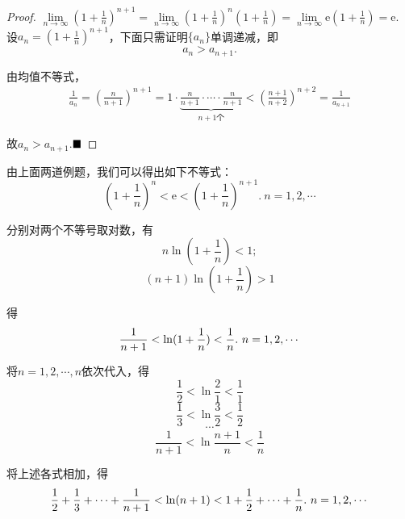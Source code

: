 \begin{proof}
	$\lim\limits_{n\to\infty}(1+\frac{1}{n})^{n+1}=\lim\limits_{n\to\infty}(1+\frac{1}{n})^n(1+\frac{1}{n})=\lim\limits_{n\to\infty}\text{e}(1+\frac{1}{n})=\text{e}.$
	设$a_n=(1+\frac{1}{n})^{n+1}$，下面只需证明$\{a_n\}$单调递减，即$$a_n>a_{n+1}.$$
	
	由均值不等式，
	\begin{align*}
		\frac{1}{a_n}=(\frac{n}{n+1})^{n+1}
		=1\cdot \underbrace{\frac{n}{n+1}\cdot\cdots\cdot\frac{n}{n+1}}_{n+1\text{个}}<(\frac{n+1}{n+2})^{n+2}=\frac{1}{a_{n+1}}
	\end{align*}
	
	故$a_n>a_{n+1}$.$\hfill\blacksquare$
\end{proof}
由上面两道例题，我们可以得出如下不等式：
\begin{equation}
	(1+\frac{1}{n})^n<\text{e}<(1+\frac{1}{n})^{n+1}.\ n=1,2,\cdots
\end{equation}

分别对两个不等号取对数，有
$$n\ln(1+\frac{1}{n})<1;$$
$$(n+1)\ln(1+\frac{1}{n})>1$$

得
\begin{equation}{\label{equ:xln}}
	\frac{1}{n+1}<\ln(1+\frac{1}{n})<\frac{1}{n}.\ n=1,2,\cdots
\end{equation}

将$n=1,2,\cdots,n$依次代入，得
$$\frac{1}{2}<\ln\frac{2}{1}<\frac{1}{1}$$
$$\frac{1}{3}<\ln\frac{3}{2}<\frac{1}{2}$$
$$\cdots$$
$$\frac{1}{n+1}<\ln\frac{n+1}{n}<\frac{1}{n}$$

将上述各式相加，得
\begin{equation}{\label{tiaohe}}
	\frac{1}{2}+\frac{1}{3}+\cdots+\frac{1}{n+1}<\ln(n+1)<1+\frac{1}{2}+\cdots+\frac{1}{n}.\ n=1,2,\cdots
\end{equation}

